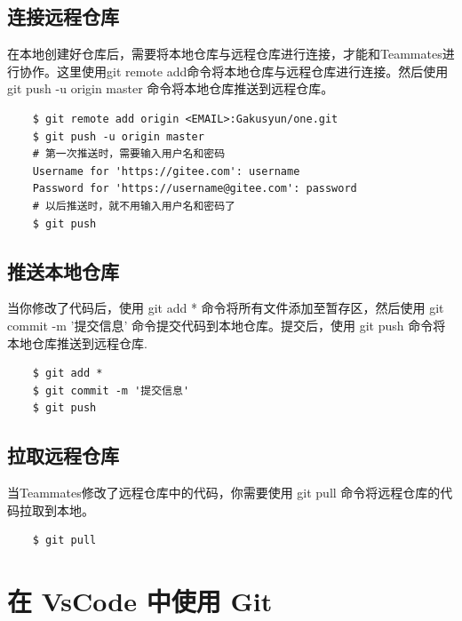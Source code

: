 \documentclass[UTF8]{ctexart}
\begin{document}
\subsection{连接远程仓库}
在本地创建好仓库后，需要将本地仓库与远程仓库进行连接，才能和Teammates进行协作。这里使用git remote add命令将本地仓库与远程仓库进行连接。然后使用 git push -u origin master 命令将本地仓库推送到远程仓库。
\begin{verbatim}
    $ git remote add origin <EMAIL>:Gakusyun/one.git
    $ git push -u origin master
    # 第一次推送时，需要输入用户名和密码
    Username for 'https://gitee.com': username
    Password for 'https://username@gitee.com': password
    # 以后推送时，就不用输入用户名和密码了
    $ git push
\end{verbatim}
\subsection{推送本地仓库}
当你修改了代码后，使用 git add * 命令将所有文件添加至暂存区，然后使用 git commit -m '提交信息' 命令提交代码到本地仓库。提交后，使用 git push 命令将本地仓库推送到远程仓库.
\begin{verbatim}
    $ git add *
    $ git commit -m '提交信息'
    $ git push
\end{verbatim}
\subsection{拉取远程仓库}
当Teammates修改了远程仓库中的代码，你需要使用 git pull 命令将远程仓库的代码拉取到本地。
\begin{verbatim}
    $ git pull
\end{verbatim}
\newpage
\section{在 VsCode 中使用 Git}
\end{document}
